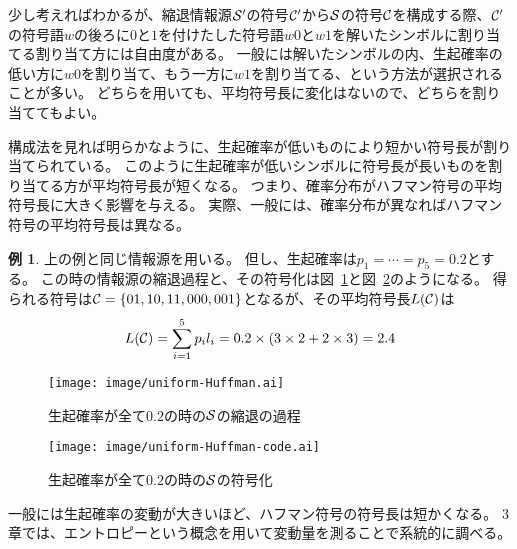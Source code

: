 \documentclass[pdflatex, ja=standard, a4paper]{bxjsarticle}
\theoremstyle{definition}
\newtheorem{example}{例}
\newcommand{\figref}[1]{図~\ref{#1}}
\begin{document}
少し考えればわかるが、縮退情報源$\mathcal{S}'$の符号$\mathcal{C}'$から$\mathcal{S}$の符号$\mathcal{C}$を構成する際、$\mathcal{C}'$の符号語$w$の後ろに$0$と$1$を付けたした符号語$w 0$と$w 1$を解いたシンボルに割り当てる割り当て方には自由度がある。
一般には解いたシンボルの内、生起確率の低い方に$w 0$を割り当て、もう一方に$w 1$を割り当てる、という方法が選択されることが多い。
どちらを用いても、平均符号長に変化はないので、どちらを割り当ててもよい。

構成法を見れば明らかなように、生起確率が低いものにより短かい符号長が割り当てられている。
このように生起確率が低いシンボルに符号長が長いものを割り当てる方が平均符号長が短くなる。
つまり、確率分布がハフマン符号の平均符号長に大きく影響を与える。
実際、一般には、確率分布が異なればハフマン符号の平均符号長は異なる。
\begin{screen}
    \begin{example}
        上の例と同じ情報源を用いる。
        但し、生起確率は$p_1 = \cdots = p_5 = 0.2$とする。
        この時の情報源の縮退過程と、その符号化は\figref{fig:uniform-reduce-source}と\figref{fig:construct-uniform-huffmapn-code}のようになる。
        得られる符号は$\mathcal{C} = \{01, 10, 11, 000, 001\}$となるが、その平均符号長$L(\mathcal{C})$は
        \begin{align*}
            L(\mathcal{C}) = \sum_{i = 1}^5 p_i l_i = 0.2 \times (3 \times 2 + 2 \times 3) = 2.4
        \end{align*}
    \end{example}
\end{screen}
\begin{figure}
    \centering
    \texttt{[image: image/uniform-Huffman.ai]}
    \caption{生起確率が全て$0.2$の時の$\mathcal{S}$の縮退の過程}
    \label{fig:uniform-reduce-source}
\end{figure}
\begin{figure}
    \centering
    \texttt{[image: image/uniform-Huffman-code.ai]}
    \caption{生起確率が全て$0.2$の時の$\mathcal{S}$の符号化}
    \label{fig:construct-uniform-huffmapn-code}
\end{figure}
一般には生起確率の変動が大きいほど、ハフマン符号の符号長は短かくなる。
3章では、エントロピーという概念を用いて変動量を測ることで系統的に調べる。
\end{document}
